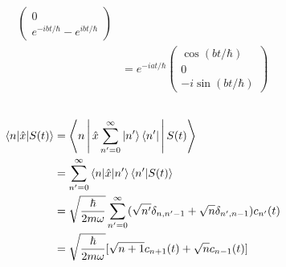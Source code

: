 \documentclass{article}
\begin{document}
\begin{enumerate}
\begin{align*}
\begin{pmatrix}
                                                               0                                      \\
                                                               e^{-i b t / \hbar} - e^{i b t / \hbar}
                                                             \end{pmatrix}                                      \\
                          & = e^{-i a t / \hbar} \begin{pmatrix}
                                                   \cos (b t / \hbar) \\
                                                   0                  \\
                                                   -i \sin (b t / \hbar)
                                                 \end{pmatrix}
        \end{align*}
\end{enumerate}

\subsection{}

\begin{align*}
  \braket{n | \hat{x} | S(t)} & = \Braket{n | \hat{x} \sum_{n' = 0}^\infty \Ket{n'} \Bra{n'} | S(t)}                                                          \\
                              & = \sum_{n' = 0}^\infty \braket{n | \hat{x} | n'} \braket{n' | S(t)}                                                           \\
                              & = \sqrt{\frac{\hbar}{2 m \omega}} \sum_{n' = 0}^\infty (\sqrt{n'} \delta_{n, n' - 1} + \sqrt{n} \delta_{n', n - 1}) c_{n'}(t) \\
                              & = \sqrt{\frac{\hbar}{2 m \omega}} [\sqrt{n + 1} c_{n + 1}(t) + \sqrt{n} c_{n - 1}(t)]
\end{align*}

\subsection{}
\end{document}
